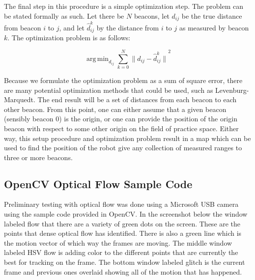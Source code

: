 \documentclass{article}
\DeclareMathOperator*{\argmin}{arg\,min}
\begin{document}
    The final step in this procedure is a simple optimization step. The problem can be stated formally as such. Let there be $N$ beacons, let $d_{ij}$ be the true distance from beacon $i$ to $j$, and let $\hat{d}^k_{ij}$ by the distance from $i$ to $j$ as measured by beacon $k$. The optimization problem is as follows:

    \begin{equation} \label{eq:beacon_optimization}
      \argmin_{d_{ij}}\sum_{k=0}^N{\lVert d_{ij}-\hat{d}^k_{ij} \rVert}^2
    \end{equation}

    Because we formulate the optimization problem as a sum of square error, there are many potential optimization methods that could be used, such as Levenburg-Marquedt. The end result will be a set of distances from each beacon to each other beacon. From this point, one can either assume that a given beacon (sensibly beacon 0) is the origin, or one can provide the position of the origin beacon with respect to some other origin on the field of practice space. Either way, this setup procedure and optimization problem result in a map which can be used to find the position of the robot give any collection of measured ranges to three or more beacons.

	\subsection{OpenCV Optical Flow Sample Code}

    Preliminary testing with optical flow was done using a Microsoft USB camera using the sample code provided in OpenCV. In the screenshot below the window labeled flow that there are a variety of green dots on the screen. These are the points that dense optical flow has identified. There is also a green line which is the motion vector of which way the frames are moving. The middle window labeled HSV flow is adding color to the different points that are currently the best for tracking on the frame. The bottom window labeled glitch is the current frame and previous ones overlaid showing all of the motion that has happened.
\end{document}
